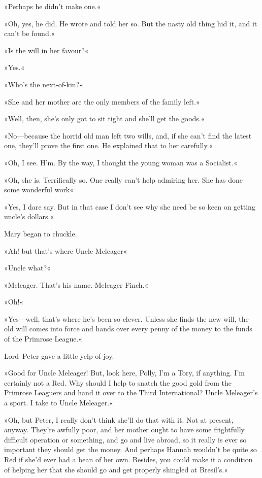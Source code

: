 »Perhaps he didn't make one.«

»Oh, yes, he did. He wrote and told her so. But the nasty old thing hid it, and it can't be found.«

»Is the will in her favour?«

»Yes.«

»Who's the next-of-kin?«

»She and her mother are the only members of the family left.«

»Well, then, she's only got to sit tight and she'll get the goods.«

»No—because the horrid old man left two wills, and, if she can't find the latest one, they'll prove the first one. He explained that to her carefully.«

»Oh, I see. H'm. By the way, I thought the young woman was a Socialist.«

»Oh, she is. Terrifically so. One really can't help admiring her. She has done some wonderful work\longdash«

»Yes, I dare say. But in that case I don't see why she need be so keen on getting uncle's dollars.«

Mary began to chuckle.

»Ah! but that's where Uncle Meleager\longdash«

»Uncle what?«

»Meleager. That's his name. Meleager Finch.«

»Oh!«

»Yes—well, that's where he's been so clever. Unless she finds the new will, the old will comes into force and hands over every penny of the money to the funds of the Primrose League.«

Lord~Peter gave a little yelp of joy.

»Good for Uncle Meleager! But, look here, Polly, I'm a Tory, if anything. I'm certainly not a Red. Why should I help to snatch the good gold from the Primrose Leaguers and hand it over to the Third International? Uncle Meleager's a sport. I take to Uncle Meleager.«

»Oh, but Peter, I really don't think she'll do that with it. Not at present, anyway. They're awfully poor, and her mother ought to have some frightfully difficult operation or something, and go and live abroad, so it really is ever so important they should get the money. And perhaps Hannah wouldn't be quite so Red if she'd ever had a bean of her own. Besides, you could make it a condition of helping her that she should go and get properly shingled at Bresil's.«


